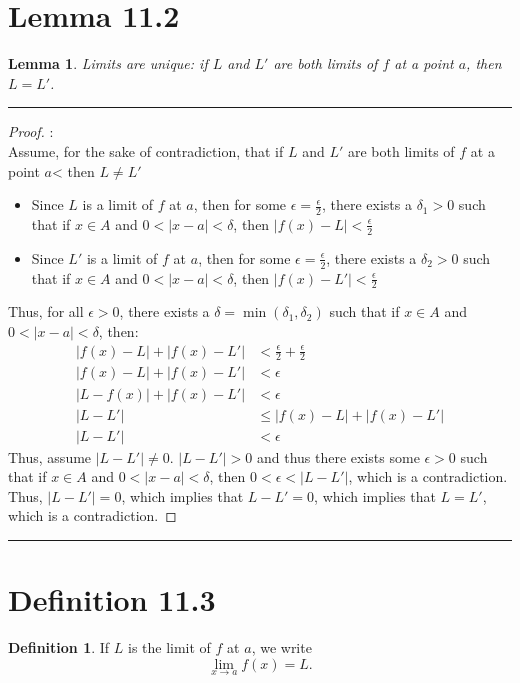 \documentclass[openany, amssymb, psamsfonts]{amsart}
\newtheorem{lem}{Lemma}[section]
\theoremstyle{definition}
\newtheorem{defn}{Definition}[section]
\numberwithin{equation}{section}
\begin{document}
\section*{Lemma 11.2}
\begin{lem}
\label{11.2}
	Limits are unique: if $L$ and $L'$ are both limits of $f$ at a point $a$, then $L = L'$. 
\end{lem}
 \vspace{4pt}     \hrule   \vspace{4pt}\begin{proof}:\\
 Assume, for the sake of contradiction, that if $L$ and $L'$ are both limits of $f$ at a point $a$< then $L \neq L'$
 \begin{itemize}
\item  Since $L$ is a limit of $f$ at $a$, then for some $\epsilon = \frac{\epsilon}{2}$, there exists a $\delta_1>0$ such that if $x\in A$ and $0< |x-a| < \delta$, then $|f(x) - L|<\frac{\epsilon}{2}$
\item Since $L'$ is a limit of $f$ at $a$, then for some $\epsilon = \frac{\epsilon}{2}$, there exists a $\delta_2>0$ such that if $x\in A$ and $0< |x-a| < \delta$, then $|f(x) - L'|<\frac{\epsilon}{2}$
 \end{itemize}
Thus, for all $\epsilon>0$, there exists a $\delta = \min(\delta_1, \delta_2)$ such that if $x\in A$ and $0< |x-a|< \delta$, then:
\begin{align*}
|f(x) - L| + |f(x) - L'|&< \frac{\epsilon}{2} + \frac{\epsilon}{2}\\
|f(x) - L| + |f(x) - L'|&< \epsilon\\
|L - f(x)| + |f(x) - L'| &< \epsilon\\
|L - L'| &\leq |f(x) - L| + |f(x) - L'|\\
|L - L'| &< \epsilon
\end{align*}
Thus, assume $|L-L'| \neq 0$. $|L - L'|> 0$ and thus there exists some $\epsilon>0$ such that if $x\in A$ and $0< |x-a|<\delta$, then $0<\epsilon< |L - L'|$, which is a contradiction. Thus, $|L - L'| = 0$, which implies that $L - L' = 0$, which implies that $L = L'$, which is a contradiction.
\end{proof} \vspace{4pt}     \hrule   \vspace{4pt}

\section*{Definition 11.3}
\begin{defn}
\label{11.3}
	If $L$ is the limit of $f$ at $a$, we write
	\[
		\lim_{x \to a} f(x) = L.
	\]
\end{defn}
\end{document}
